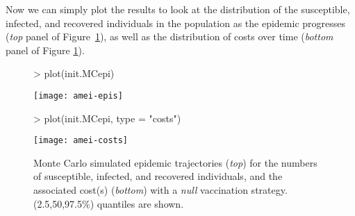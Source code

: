 \documentclass[shortnames,nojss]{jss}
\begin{document}
Now we can simply plot the results to look at the distribution of the
susceptible, infected, and recovered individuals in the population as
the epidemic progresses ({\em top} panel of Figure~\ref{f:epis}), as well as
the distribution of costs over time ({\em bottom} panel of Figure
\ref{f:epis}).
\begin{figure}[ht!]
\begin{Schunk}
\begin{Sinput}
> plot(init.MCepi)
\end{Sinput}
\end{Schunk}
\centering
\texttt{[image: amei-epis]}
\begin{Schunk}
\begin{Sinput}
> plot(init.MCepi, type = "costs")
\end{Sinput}
\end{Schunk}
\texttt{[image: amei-costs]}
\caption{Monte Carlo simulated epidemic trajectories ({\em top}) for the numbers
  of susceptible, infected, and recovered individuals, and the associated
  cost(s) ({\em bottom}) with a {\em null} vaccination strategy. 
  (2.5,50,97.5\%) quantiles are shown. }
\label{f:epis}
\end{figure}
\end{document}

